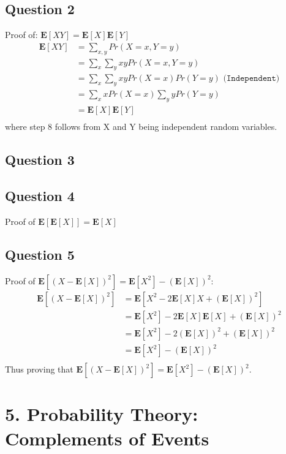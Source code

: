 \documentclass{article}
\begin{document}
\subsection{Question 2}
Proof of: $ \mathbf{E}[XY]= \mathbf{E}[X] \mathbf{E}[Y]$
\begin{align}
\mathbf{E}[XY] &= \sum\limits_{x,y} Pr(X=x,Y=y) \\
&= \sum\limits_{x}\sum\limits_{y} xy Pr(X=x,Y=y) \\
&= \sum\limits_{x}\sum\limits_{y} xy Pr(X=x)Pr(Y=y) \texttt{  (Independent)} \\
&= \sum\limits_{x}x Pr(X=x)\sum\limits_{y} y Pr (Y=y) \\
&= \mathbf{E}[X] \mathbf{E}[Y] \\
\end{align}
where step 8 follows from X and Y being independent random variables.
\subsection{Question 3}
\subsection{Question 4}
Proof of $ \mathbf{E}[\mathbf{E}[X]] = \mathbf{E}[X] $
\subsection{Question 5}
Proof of $\mathbf{E}\left[(X-\mathbf{E}[X])^2 \right] = 
\mathbf{E}[X^2]-\left( \mathbf{E}[X] \right) ^2:
$
\begin{align*}
\mathbf{E}\left[(X-\mathbf{E}[X])^2 \right] &=
\mathbf{E}\left[X^2-2\mathbf{E}[X]X+  \left(\mathbf{E}[X]\right)^2 \right]\\
&=
\mathbf{E}[X^2]-2\mathbf{E}[X]\mathbf{E}[X]+\left(\mathbf{E}[X]\right)^2 \\
&=
\mathbf{E}[X^2]-2 \left(\mathbf{E}[X]\right)^2 +\left(\mathbf{E}[X]\right)^2 \\
&=
\mathbf{E}[X^2]-\left(\mathbf{E}[X]\right)^2\\
\end{align*}
Thus proving that $\mathbf{E}\left[(X-\mathbf{E}[X])^2 \right] = 
\mathbf{E}[X^2]-\left( \mathbf{E}[X] \right) ^2$.


\section{5. Probability Theory: Complements of Events}
\end{document}
